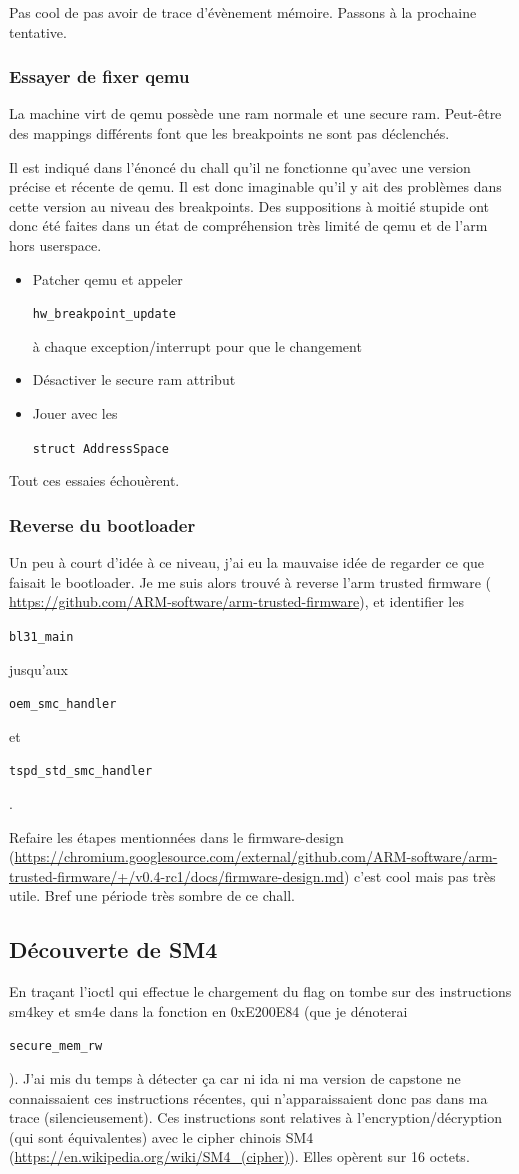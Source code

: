 \documentclass[14pt]{article}
\newcommand{\inlinebox}[2]{%
\colorbox{bg}{%
\parbox[b][0.6em]{\widthof{\texttt{#2}}}{\texttt{#2}}
}
}
\newcommand{\inlinec}[1]{ \inlinebox{c}{#1} }
\theoremstyle{definition}
\begin{document}
Pas cool de pas avoir de trace d'évènement mémoire. Passons à la prochaine tentative.


\subsubsection {Essayer de fixer qemu}
La machine virt de qemu possède une ram normale et une secure ram. 
Peut-être des mappings différents font que les breakpoints ne sont pas déclenchés.

Il est indiqué dans l'énoncé du chall qu'il ne fonctionne qu'avec une version précise et récente de qemu. Il est donc imaginable qu'il y ait des problèmes dans cette version au niveau des breakpoints.
Des suppositions à moitié stupide ont donc été faites dans un état de compréhension très limité de qemu et de l'arm hors userspace.


\begin{itemize}
\item Patcher qemu et appeler \inlinec{hw_breakpoint_update} à chaque exception/interrupt pour que le changement
\item Désactiver le secure ram attribut
\item Jouer avec les \inlinec{struct AddressSpace}
\end{itemize}

Tout ces essaies échouèrent.

\subsubsection {Reverse du bootloader}
Un peu à court d'idée à ce niveau, j'ai eu la mauvaise idée de regarder ce que faisait le bootloader.
Je me suis alors trouvé à reverse l'arm trusted firmware ( \url{https://github.com/ARM-software/arm-trusted-firmware}), et identifier les \inlinec{bl31_main} jusqu'aux \inlinec{oem_smc_handler} et \inlinec{tspd_std_smc_handler}.


Refaire les étapes mentionnées dans le firmware-design (\url{https://chromium.googlesource.com/external/github.com/ARM-software/arm-trusted-firmware/+/v0.4-rc1/docs/firmware-design.md}) c'est cool mais pas très utile.
Bref une période très sombre de ce chall.


\subsection{Découverte de SM4}

En traçant l'ioctl qui effectue le chargement du flag on tombe sur des instructions sm4key et sm4e dans la fonction en 0xE200E84 (que je dénoterai \inlinec{secure_mem_rw}). J'ai mis du temps à détecter ça car ni ida ni ma version de capstone ne connaissaient ces instructions récentes, qui n'apparaissaient donc pas dans ma trace (silencieusement).
Ces instructions sont relatives à l'encryption/décryption (qui sont équivalentes) avec le cipher chinois SM4 (\url{https://en.wikipedia.org/wiki/SM4_(cipher)}). Elles opèrent sur 16 octets.
\end{document}
